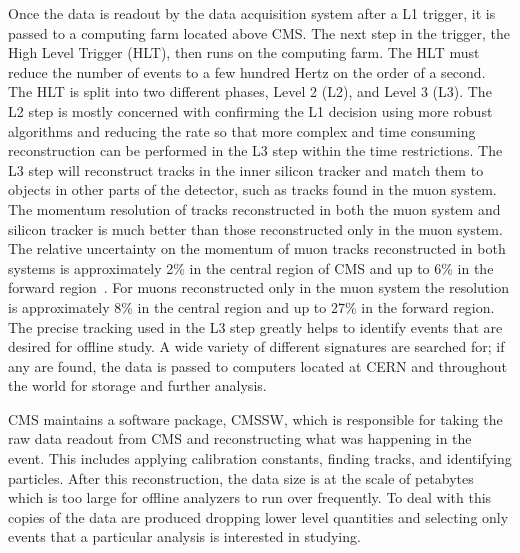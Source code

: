 Once the data is readout by the data acquisition system after a L1 trigger, it is passed to a computing farm located above CMS.
The next step in the trigger, the High Level Trigger (HLT), then runs on the computing farm.
The HLT must reduce the number of events to a few hundred Hertz on the order of a second. 
The HLT is split into two different
phases, Level 2 (L2), and Level 3 (L3). The L2 step is mostly concerned with confirming the L1 decision using more robust algorithms
and reducing the rate so that more complex and time consuming reconstruction can be performed in the L3 step within the time restrictions.
The L3 step will reconstruct tracks in the inner silicon tracker and match them
to objects in other parts of the detector, such as tracks found in the muon system. The momentum resolution of tracks reconstructed in both the muon system and silicon tracker
is much better than those reconstructed only in the muon system. The relative uncertainty on the momentum of muon tracks reconstructed in both systems is approximately
2\% in the central region of CMS and up to 6\% in the forward region~\cite{2012JInst...7P0002T}. For muons reconstructed only in the muon system the resolution is approximately 8\%
in the central region and up to 27\% in the forward region. 
The precise tracking used in the L3 step greatly helps to identify events that are desired for offline study.
A wide variety of different signatures are searched for; if any are found, the data is passed to computers located at CERN
and throughout the world for storage and further analysis.

CMS maintains a software package, CMSSW, which is responsible for taking the raw data readout from CMS and reconstructing what was happening in the event.
This includes applying calibration constants, finding tracks, and identifying particles.
After this reconstruction, the data size is at the scale of petabytes which is too large for offline analyzers to run over frequently. 
To deal with this copies of the data are produced dropping lower level quantities and selecting only events that a particular analysis is interested in studying.

